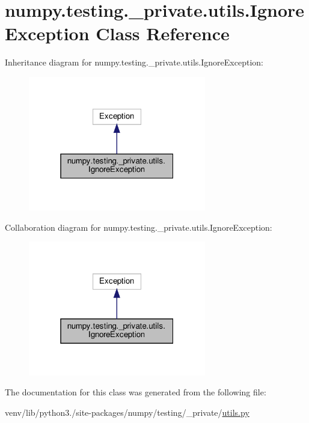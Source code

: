 \hypertarget{classnumpy_1_1testing_1_1__private_1_1utils_1_1IgnoreException}{}\section{numpy.\+testing.\+\_\+private.\+utils.\+Ignore\+Exception Class Reference}
\label{classnumpy_1_1testing_1_1__private_1_1utils_1_1IgnoreException}


Inheritance diagram for numpy.\+testing.\+\_\+private.\+utils.\+Ignore\+Exception\+:
\nopagebreak
\begin{figure}[H]
\begin{center}
\leavevmode
\includegraphics[width=220pt]{classnumpy_1_1testing_1_1__private_1_1utils_1_1IgnoreException__inherit__graph}
\end{center}
\end{figure}


Collaboration diagram for numpy.\+testing.\+\_\+private.\+utils.\+Ignore\+Exception\+:
\nopagebreak
\begin{figure}[H]
\begin{center}
\leavevmode
\includegraphics[width=220pt]{classnumpy_1_1testing_1_1__private_1_1utils_1_1IgnoreException__coll__graph}
\end{center}
\end{figure}


The documentation for this class was generated from the following file\+:\begin{DoxyCompactItemize}
\item 
venv/lib/python3./site-\/packages/numpy/testing/\+\_\+private/\hyperlink{numpy_2testing_2__private_2utils_8py}{utils.\+py}\end{DoxyCompactItemize}
